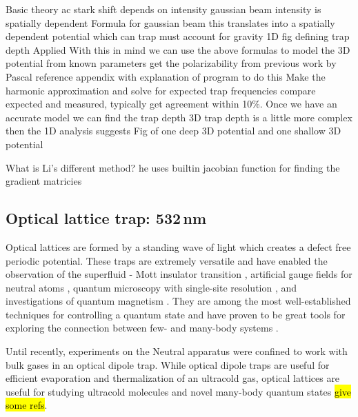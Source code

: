  

Basic theory
	ac stark shift depends on intensity
	gaussian beam intensity is spatially dependent
		Formula for gaussian beam
	this translates into a spatially dependent potential which can trap
	must account for gravity
		1D fig defining trap depth
Applied
	With this in mind we can use the above formulas to model the 3D potential from known parameters
		get the polarizability from previous work by Pascal
		reference appendix with explanation of program to do this
	Make the harmonic approximation and solve for expected trap frequencies
		compare expected and measured, typically get agreement within 10\%.
	Once we have an accurate model we can find the trap depth
		3D trap depth is a little more complex then the 1D analysis suggests
		Fig of one deep 3D potential and one shallow 3D potential




What is Li's different method?
	he uses builtin jacobian function for finding the gradient matricies 

\subsection{Optical lattice trap: 532\,nm} \label{ssec:532sys}
Optical lattices are formed by a standing wave of light which creates a defect free periodic potential.
These traps are extremely versatile and have enabled the observation of the superfluid - Mott insulator transition \cite{Greiner2002}, artificial gauge fields for neutral atoms \cite{Lin2011}, quantum microscopy with single-site resolution \cite{Bakr2009}, and investigations of quantum magnetism \cite{Hart2015,Greif2015}. 
They are among the most well-established techniques for controlling a quantum state and have proven to be great tools for exploring the connection between few- and many-body systems \cite{Bloch2008}.

Until recently, experiments on the Neutral apparatus were confined to work with bulk gases in an optical dipole trap.
While optical dipole traps are useful for efficient evaporation and thermalization of an ultracold gas, optical lattices are useful for studying ultracold molecules and novel many-body quantum states \hl{give some refs}.


